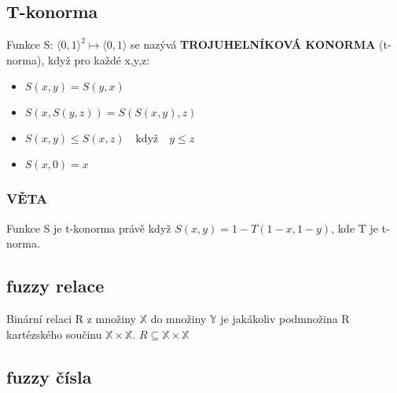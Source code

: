 {\subsection{T-konorma}
Funkce S: $\langle0,1\rangle^2\mapsto\langle0,1\rangle$ se nazývá \textbf{TROJUHELNÍKOVÁ KONORMA} (t-norma), když pro každé x,y,z: 

\begin{itemize}
\item $S(x,y)=S(y,x)$
\item $S(x,S(y,z))=S(S(x,y),z)$
\item $S(x,y) \leq S(x,z)\quad \text{když} \quad y\leq z$
\item $S(x,0)=x$
\end{itemize}

\subsubsection{VĚTA}
Funkce S je t-konorma právě když 
$S(x,y)=1-T(1-x,1-y)$, kde T je t-norma.
\subsection{fuzzy relace}
Binární relaci R z množiny $\mathbb{X}$ do množiny $\mathbb{Y}$ je jakákoliv podmnožina R kartézského součinu $\mathbb{X}\times\mathbb{X}$. $R\subseteq\mathbb{X}\times\mathbb{X}$
\subsection{fuzzy čísla}
}

